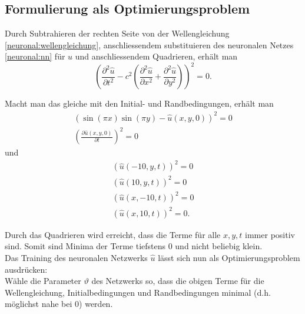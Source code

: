 \subsection{Formulierung als Optimierungsproblem}\label{neuronal:subsection:optimierungsproblem}
Durch Subtrahieren der rechten Seite von der Wellengleichung \eqref{neuronal:wellengleichung}, anschliessendem substituieren des neuronalen Netzes \eqref{neuronal:nn} für \( u \) und anschliessendem Quadrieren, erhält man
\begin{equation}
    \left(\frac{\partial^2 \hat{u}}{\partial t^2} - c^2 \left( \frac{\partial^2 \hat{u}}{\partial x^2} + \frac{\partial^2 \hat{u}}{\partial y^2} \right)\right)^2 = 0.
\end{equation}

Macht man das gleiche mit den Initial- und Randbedingungen, erhält man
\begin{equation}
    \begin{aligned}
        \left(\sin(\pi x) \sin(\pi y) - \hat{u}(x, y, 0)\right)^2 = 0\\
        \left(\frac{\partial \hat{u}(x, y, 0)}{\partial t}\right)^2 = 0
    \end{aligned}
\end{equation}
und
\begin{equation}
    \begin{aligned}
        \left(\hat{u}(-10, y, t)\right)^2 = 0\\
        \left(\hat{u}(10, y, t)\right)^2 = 0\\
        \left(\hat{u}(x, -10, t)\right)^2 = 0\\
        \left(\hat{u}(x, 10, t)\right)^2 = 0.
    \end{aligned}
\end{equation}

Durch das Quadrieren wird erreicht, dass die Terme für alle \( x, y, t \) immer positiv sind.
Somit sind Minima der Terme tiefstens 0 und nicht beliebig klein.\\

Das Training des neuronalen Netzwerks \( \hat{u} \) lässt sich nun als Optimierungsproblem ausdrücken:\\
Wähle die Parameter \( \vartheta \) des Netzwerks so, dass die obigen Terme für die Wellengleichung, Initialbedingungen und Randbedingungen minimal (d.h. möglichst nahe bei 0) werden.\\

